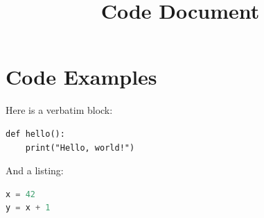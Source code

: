 \documentclass{article}
\title{Code Document}
\begin{document}
\maketitle

\section{Code Examples}

Here is a verbatim block:

\begin{verbatim}
def hello():
    print("Hello, world!")
\end{verbatim}

And a listing:

\begin{lstlisting}[language=Python]
x = 42
y = x + 1
\end{lstlisting}
\end{document}

